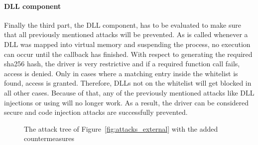 \paragraph{\gls{DLL} component}
Finally the third part, the \gls{DLL} component, has to be evaluated to make sure that all previously mentioned attacks will be prevented. As  is called whenever a \gls{DLL} was mapped into virtual memory and suspending the process, no execution can occur until the callback has finished. With respect to generating the required sha256 hash, the driver is very restrictive and if a required function call fails, access is denied. Only in cases where a matching entry inside the whitelist is found, access is granted. Therefore, \glspl{DLL} not on the whitelist will get blocked in all other cases. Because of that, any of the previously mentioned attacks like \gls{DLL} injections or using  will no longer work. As a result, the driver can be considered secure and code injection attacks are successfully prevented.
\begin{figure}[h] 
 \centering
\caption{The attack tree of Figure~\ref{fig:attacks_external} with the added countermeasures}
\label{fig:attacks_external_def}
\end{figure}
\restoregeometry